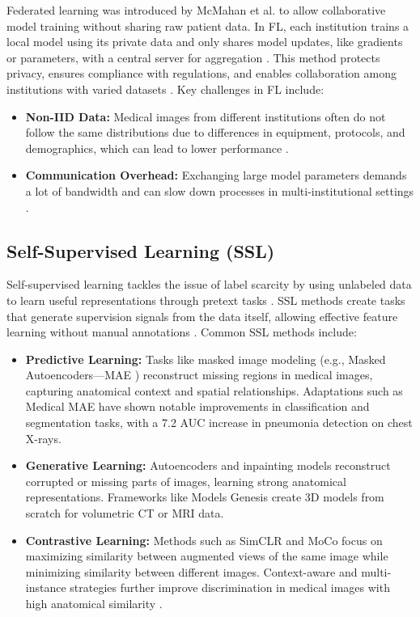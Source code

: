 \documentclass[a4paper, 10 pt, conference]{ieeeconf}
\begin{document}
Federated learning was introduced by McMahan et al. \cite{mcmahan2017communication} to allow collaborative model training without sharing raw patient data. In FL, each institution trains a local model using its private data and only shares model updates, like gradients or parameters, with a central server for aggregation \cite{Li2020}. This method protects privacy, ensures compliance with regulations, and enables collaboration among institutions with varied datasets \cite{Kairouz2019}. Key challenges in FL include:

\begin{itemize}
    \item \textbf{Non-IID Data:} Medical images from different institutions often do not follow the same distributions due to differences in equipment, protocols, and demographics, which can lead to lower performance \cite{Zhao2018}.
    \item \textbf{Communication Overhead:} Exchanging large model parameters demands a lot of bandwidth and can slow down processes in multi-institutional settings \cite{Konecny2016}.
\end{itemize}

\subsection{Self-Supervised Learning (SSL)}

Self-supervised learning tackles the issue of label scarcity by using unlabeled data to learn useful representations through pretext tasks \cite{Jing2020}. SSL methods create tasks that generate supervision signals from the data itself, allowing effective feature learning without manual annotations \cite{Liu2021}. Common SSL methods include:

\begin{itemize}
    \item \textbf{Predictive Learning:} Tasks like masked image modeling (e.g., Masked Autoencoders—MAE \cite{MAE}) reconstruct missing regions in medical images, capturing anatomical context and spatial relationships. Adaptations such as Medical MAE \cite{Tang2022} have shown notable improvements in classification and segmentation tasks, with a 7.2 AUC increase in pneumonia detection on chest X-rays.
    \item \textbf{Generative Learning:} Autoencoders and inpainting models reconstruct corrupted or missing parts of images, learning strong anatomical representations. Frameworks like Models Genesis \cite{ModelsGenesis} create 3D models from scratch for volumetric CT or MRI data.
    \item \textbf{Contrastive Learning:} Methods such as SimCLR \cite{SimCLR} and MoCo \cite{MoCo} focus on maximizing similarity between augmented views of the same image while minimizing similarity between different images. Context-aware and multi-instance strategies further improve discrimination in medical images with high anatomical similarity \cite{Azizi2021}.
\end{itemize}
\end{document}
